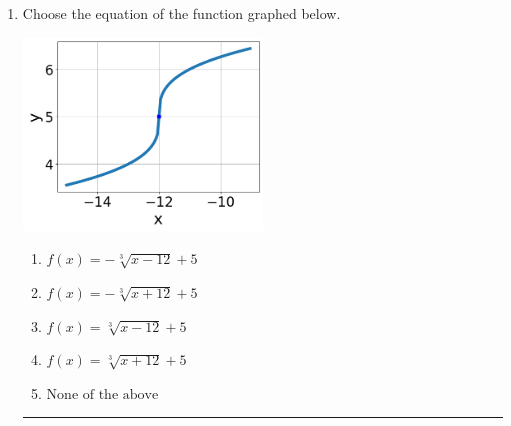 \documentclass[14pt]{extbook}
\newcommand{\litem}[1]{\item#1\hspace*{-1cm}\rule{\textwidth}{0.4pt}}
\begin{document}
\begin{enumerate}
\litem{
Choose the equation of the function graphed below.
\begin{center}
    \includegraphics[width=0.5\textwidth]{../Figures/radicalGraphToEquationCopyA.png}
\end{center}
\begin{enumerate}[label=\Alph*.]
\item \( f(x) = - \sqrt[3]{x - 12} + 5 \)
\item \( f(x) = - \sqrt[3]{x + 12} + 5 \)
\item \( f(x) = \sqrt[3]{x - 12} + 5 \)
\item \( f(x) = \sqrt[3]{x + 12} + 5 \)
\item \( \text{None of the above} \)


\end{enumerate}}
\end{enumerate}
\end{document}
